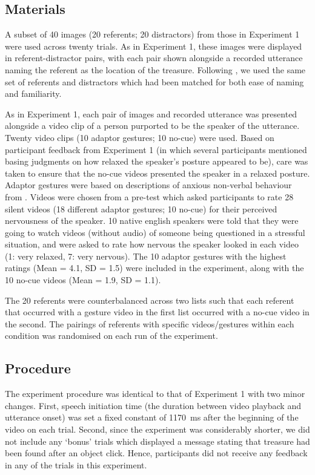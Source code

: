 \documentclass[a4paper,man,natbib]{apa6}
\begin{document}
\subsection{Materials}
A subset of 40 images (20 referents; 20 distractors) from those in Experiment 1 were used across twenty trials.
As in Experiment 1, these images were displayed in referent-distractor pairs, with each pair shown alongside a recorded utterance naming the referent as the location of the treasure.
Following \citet{Loy2017}, we used the same set of referents and distractors which had been matched for both ease of naming and familiarity.


As in Experiment 1, each pair of images and recorded utterance was presented alongside a video clip of a person purported to be the speaker of the utterance.
Twenty video clips (10 adaptor gestures; 10 no-cue) were used. 
Based on participant feedback from Experiment 1 (in which several participants mentioned basing judgments on how relaxed the speaker's posture appeared to be), care was taken to ensure that the no-cue videos presented the speaker in a relaxed posture. 
Adaptor gestures were based on descriptions of anxious non-verbal behaviour from \citet{Gregersen2005}.
Videos were chosen from a pre-test which asked participants to rate 28 silent videos (18 different adaptor gestures; 10 no-cue) for their perceived nervousness of the speaker. 
10 native english speakers were told that they were going to watch videos (without audio) of someone being questioned in a stressful situation, and were asked to rate how nervous the speaker looked in each video (1: very relaxed, 7: very nervous). 
The 10 adaptor gestures with the highest ratings (Mean = 4.1, SD = 1.5) were included in the experiment, along with the 10 no-cue videos (Mean = 1.9, SD = 1.1).

The 20 referents were counterbalanced across two lists such that each referent that occurred with a gesture video in the first list occurred with a no-cue video in the second.
The pairings of referents with specific videos/gestures within each condition was randomised on each run of the experiment.

\subsection{Procedure}
The experiment procedure was identical to that of Experiment 1 with two minor changes.
First, speech initiation time (the duration between video playback and utterance onset) was set a fixed constant of 1170~ms after the beginning of the video on each trial.
Second, since the experiment was considerably shorter, we did not include any `bonus' trials which displayed a message stating that treasure had been found after an object click.
Hence, participants did not receive any feedback in any of the trials in this experiment.
\end{document}
